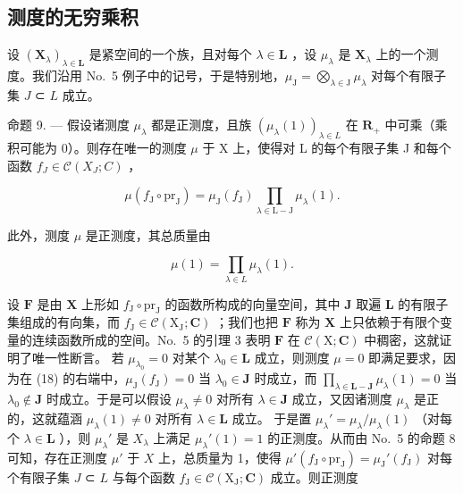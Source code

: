 \subsection{测度的无穷乘积}

设 \((\mathbf{X}_{\lambda})_{\lambda \in \mathbf{L}}\) 是紧空间的一个族，且对每个 \(\lambda \in \mathbf{L}\) ，设 \(\mu_{\lambda}\) 是 \(\mathbf{X}_{\lambda}\) 上的一个测度。我们沿用 No.~5 例子中的记号，于是特别地，\(\mu_{\mathrm{J}} = \bigotimes_{\lambda \in \mathrm{J}} \mu_{\lambda}\) 对每个有限子集 \(J\) ⊂ \(L\) 成立。

命题 9. --- 假设诸测度 \(\mu_{\lambda}\) 都是正测度，且族 \((\mu_{\lambda}(1))_{\lambda \in L}\) 在 \(\mathbf{R}_{+}\) 中可乘（乘积可能为 0）。则存在唯一的测度 \(\mu\) 于 X 上，使得对 L 的每个有限子集 J 和每个函数 \(f_{J} \in \mathcal{C}(X_J; C)\) ，

\[
\mu (f _ {\mathrm{J}} \circ \mathrm{pr} _ {\mathrm{J}}) = \mu_ {\mathrm{J}} (f _ {\mathrm{J}}) \prod_ {\lambda \in \mathrm{L} - \mathrm{J}} \mu_ {\lambda} (1).\tag{18}
\]

此外，测度 \(\mu\) 是正测度，其总质量由

\[
\mu (1) = \prod_ {\lambda \in L} \mu_ {\lambda} (1).\tag{19}
\]

设 \(\mathbf{F}\) 是由 \(\mathbf{X}\) 上形如 \(f_{\mathrm{J}} \circ \mathrm{pr}_{\mathrm{J}}\) 的函数所构成的向量空间，其中 \(\mathbf{J}\) 取遍 \(\mathbf{L}\) 的有限子集组成的有向集，而 \(f_{\mathrm{J}} \in \mathcal{C}(\mathrm{X}_{\mathrm{J}}; \mathbf{C})\) ；我们也把 \(\mathbf{F}\) 称为 \(\mathbf{X}\) 上只依赖于有限个变量的连续函数所成的空间。No.~5 的引理 3 表明 \(\mathbf{F}\) 在 \(\mathcal{C}(\mathrm{X}; \mathbf{C})\) 中稠密，这就证明了唯一性断言。 若 \(\mu_{\lambda_0} = 0\) 对某个 \(\lambda_0 \in \mathbf{L}\) 成立，则测度 \(\mu = 0\) 即满足要求，因为在 (18) 的右端中，\(\mu_{\mathrm{J}}(f_{\mathrm{J}}) = 0\) 当 \(\lambda_0 \in \mathbf{J}\) 时成立，而 \(\prod_{\lambda \in \mathbf{L} - \mathbf{J}} \mu_{\lambda}(1) = 0\) 当 \(\lambda_0 \notin \mathbf{J}\) 时成立。于是可以假设 \(\mu_{\lambda} \neq 0\) 对所有 \(\lambda \in \mathbf{J}\) 成立，又因诸测度 \(\mu_{\lambda}\) 是正的，这就蕴涵 \(\mu_{\lambda}(1) \neq 0\) 对所有 \(\lambda \in \mathbf{L}\) 成立。 于是置 \(\mu_{\lambda}' = \mu_{\lambda}/\mu_{\lambda}(1)\) （对每个 \(\lambda \in \mathbf{L}\) ），则 \(\mu_{\lambda}'\) 是 \(X_{\lambda}\) 上满足 \(\mu_{\lambda}'(1) = 1\) 的正测度。从而由 No.~5 的命题 8 可知，存在正测度 \(\mu'\) 于 \(X\) 上，总质量为 1，使得 \(\mu'(f_{\mathrm{J}} \circ \mathrm{pr}_{\mathrm{J}}) = \mu_{\mathrm{J}}'(f_{\mathrm{J}})\) 对每个有限子集 \(J\) ⊂ \(L\) 与每个函数 \(f_{\mathrm{J}} \in \mathcal{C}(\mathrm{X}_{\mathrm{J}}; \mathbf{C})\) 成立。则正测度

